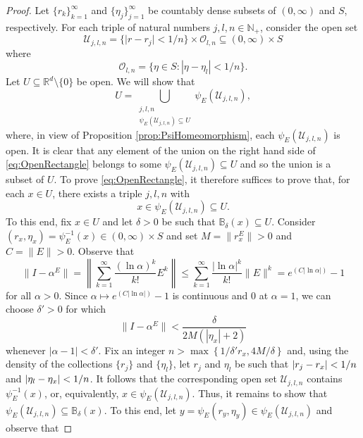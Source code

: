 \documentclass[11pt, letter]{book}
\begin{document}
\begin{proof}
Let $\{r_k\}_{k=1}^\infty$ and $\{\eta_j\}_{j=1}^\infty$ be countably dense subsets of $(0,\infty)$ and $S$, respectively.  For each triple of natural numbers $j,l,n\in\mathbb{N}_+$, consider the open set
\begin{equation*}
\mathcal{U}_{j,l,n}=\{ \vert r - r_j \vert < 1/n \}\times \mathcal{O}_{l,n}\subseteq (0,\infty)\times S
\end{equation*}
where
\begin{equation*}
\mathcal{O}_{l,n}=\{\eta\in S: |\eta-\eta_l|<1/n\}.
\end{equation*}
Let $U\subseteq \mathbb{R}^d\setminus \{0\}$ be open. We will show that
\begin{equation}\label{eq:OpenRectangle}
U=\bigcup_{\substack{j,l,n\\ \psi_E(\mathcal{U}_{j,l,n})\subseteq U}}\psi_E(\mathcal{U}_{j,l,n}),
\end{equation}
where, in view of Proposition \ref{prop:PsiHomeomorphism}, each $\psi_E(\mathcal{U}_{j,l,n})$ is open. It is clear that any element of the union on the right hand side of \eqref{eq:OpenRectangle} belongs to some $\psi_E(\mathcal{U}_{j,l,n}) \subseteq U$ and so the union is a subset of $U$. To prove \eqref{eq:OpenRectangle}, it therefore suffices to prove that, for each $x\in U$, there exists a triple $j,l,n$ with
\begin{equation*}
x\in\psi_E(\mathcal{U}_{j,l,n})\subseteq U.
\end{equation*}
To this end, fix $x\in U$ and let $\delta>0$ be such that $\mathbb{B}_\delta(x)\subseteq U$. Consider $(r_x,\eta_x)=\psi_E^{-1}(x)\in (0,\infty)\times S$ and set $M=\|r_x^E\|>0$ and $C=\|E\|>0$. Observe that 
\begin{equation*}
\|I-\alpha^E\|=\left\|\sum_{k=1}^\infty \frac{(\ln \alpha)^k}{k!} E^k\right\|\leq \sum_{k=1}^\infty \frac{|\ln \alpha|^k}{k!} \|E\|^k=e^{(C|\ln \alpha|)}-1
\end{equation*}
for all $\alpha>0$. Since $\alpha\mapsto e^{(C|\ln \alpha|)}-1$ is continuous and $0$ at $\alpha=1$, we can choose $\delta'>0$ for which
\begin{equation*}
\|I-\alpha ^E\|< \frac{\delta}{2M (  |\eta_x|+2)}
\end{equation*}
whenever $|\alpha-1|<\delta'$. Fix an integer $n>\max \left\{1/\delta'r_x, 4M/\delta \right\}$ and, using the density of the collections $\{r_j\}$ and $\{\eta_l\}$, let $r_j$ and $ \eta_l$ be such that $\abs{r_j - r_x } < 1/n$ and $\abs{\eta_l - \eta_x} < 1/n$. It follows that the corresponding open set $\mathcal{U}_{j,l,n}$ contains $\psi_E^{-1}(x)$, or, equivalently, $x\in \psi_E(\mathcal{U}_{j,l,n})$. Thus, it remains to show that $\psi_E(\mathcal{U}_{j,l,n}) \subseteq \mathbb{B}_\delta(x)$. To this end, let $y=\psi_E(r_y,\eta_y)\in\psi_E(\mathcal{U}_{j,l,n})$ and observe that

\end{proof}
\end{document}
